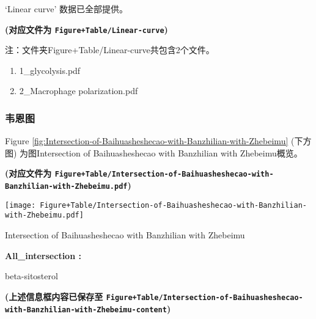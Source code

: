 \documentclass[
]{article}
\providecommand{\tightlist}{%
  \setlength{\itemsep}{0pt}\setlength{\parskip}{0pt}}
\begin{document}
`Linear curve' 数据已全部提供。

\textbf{(对应文件为 \texttt{Figure+Table/Linear-curve})}

\begin{center}\begin{tcolorbox}[colback=gray!10, colframe=gray!50, width=0.9\linewidth, arc=1mm, boxrule=0.5pt]注：文件夹Figure+Table/Linear-curve共包含2个文件。

\begin{enumerate}\tightlist
\item 1\_glycolysis.pdf
\item 2\_Macrophage polarization.pdf
\end{enumerate}\end{tcolorbox}
\end{center}

\hypertarget{ux97e6ux6069ux56fe}{%
\subsubsection{韦恩图}\label{ux97e6ux6069ux56fe}}

Figure \ref{fig:Intersection-of-Baihuasheshecao-with-Banzhilian-with-Zhebeimu} (下方图) 为图Intersection of Baihuasheshecao with Banzhilian with Zhebeimu概览。

\textbf{(对应文件为 \texttt{Figure+Table/Intersection-of-Baihuasheshecao-with-Banzhilian-with-Zhebeimu.pdf})}

\def\@captype{figure}
\begin{center}
\texttt{[image: Figure+Table/Intersection-of-Baihuasheshecao-with-Banzhilian-with-Zhebeimu.pdf]}
\caption{Intersection of Baihuasheshecao with Banzhilian with Zhebeimu}\label{fig:Intersection-of-Baihuasheshecao-with-Banzhilian-with-Zhebeimu}
\end{center}
\begin{center}\begin{tcolorbox}[colback=gray!10, colframe=gray!50, width=0.9\linewidth, arc=1mm, boxrule=0.5pt]
\textbf{
All\_intersection
:}

\vspace{0.5em}

    beta-sitosterol

\vspace{2em}
\end{tcolorbox}
\end{center}

\textbf{(上述信息框内容已保存至 \texttt{Figure+Table/Intersection-of-Baihuasheshecao-with-Banzhilian-with-Zhebeimu-content})}
\end{document}
